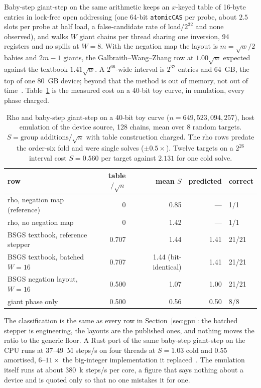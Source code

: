Baby-step giant-step on the same arithmetic keeps an $x$-keyed table
of 16-byte entries in lock-free open addressing (one 64-bit
\texttt{atomicCAS} per probe, about $2.5$ slots per probe at half
load, a false-candidate rate of load$/2^{32}$ and none observed), and
walks $W$ giant chains per thread sharing one inversion, 94 registers
and no spills at $W=8$. With the negation map the layout is $m=\sqrt{w}/2$
babies and $2m-1$ giants, the Galbraith--Wang--Zhang row at $1.00\sqrt w$
expected against the textbook $1.41\sqrt w$. A $2^{66}$-wide interval
is $2^{32}$ entries and 64~GB, the top of one 80~GB device; beyond
that the method is out of memory, not out of
time~.
Table~\ref{tab:bsgs} is the measured cost on a 40-bit toy curve, in
emulation, every phase charged.

\begin{table}[t]
\centering
\small
\caption{Rho and baby-step giant-step on a 40-bit toy curve
  ($n=649{,}523{,}094{,}257$), host emulation of the device source, 128
  chains, mean over 8 random targets. $S=\text{group additions}/\sqrt n$
  with table construction charged. The rho rows predate the order-six
  fold and were single solves ($\pm0.5\times$). Twelve targets on a
  $2^{26}$ interval cost $S=0.560$ per target against $2.131$ for one
  cold solve.}
\label{tab:bsgs}
\begin{tabular}{@{}lrrrl@{}}
\toprule
row & table$/\sqrt n$ & mean $S$ & predicted & correct \\
\midrule
rho, negation map (reference) & 0 & 0.85 & --- & 1/1 \\
rho, no negation map & 0 & 1.42 & --- & 1/1 \\
BSGS textbook, reference stepper & 0.707 & 1.44 & 1.41 & 21/21 \\
BSGS textbook, batched $W=16$ & 0.707 & 1.44 (bit-identical) & 1.41 & 21/21 \\
BSGS negation layout, $W=16$ & 0.500 & 1.07 & 1.00 & 21/21 \\
\quad giant phase only & 0.500 & 0.56 & 0.50 & 8/8 \\
\bottomrule
\end{tabular}
\end{table}

The classification is the same as every row in Section~\ref{sec:gpu}:
the batched stepper is engineering, the layouts are the published
ones, and nothing moves the ratio to the generic floor. A Rust port of
the same baby-step giant-step on the CPU runs at $37$--$49$~M
steps/s on four threads at $S=1.03$ cold and $0.55$ amortised, $6$--$11\times$
the big-integer implementation it replaced~.
The emulation itself runs at about $380$~k steps/s per core, a
figure that says nothing about a device and is quoted only so that
no one mistakes it for one.

